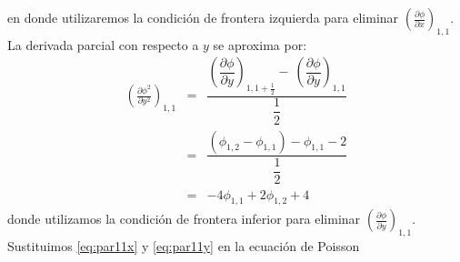 \documentclass[12pt]{article}
\begin{document}
en donde utilizaremos la condición de frontera izquierda para eliminar $\left( \frac{\partial \phi}{\partial x}\right)_{1,1}$. La derivada parcial con respecto a $y$ se aproxima por:
\begin{eqnarray}\label{eq:par11y}
\left( \frac {\partial \phi^{2}}{\partial y^{2}}\right)_{1,1} & = & \dfrac{\left( \dfrac {\partial \phi}{\partial y}\right)_{1,1+\frac{1}{2}} - \ \left( \dfrac {\partial \phi}{\partial y}\right)_{1,1}}{\dfrac{1}{2}}  \nonumber \\
& = & \dfrac {(\phi_{1,2}-\phi_{1,1})-\phi_{1,1}-2}{\dfrac{1}{2}} \nonumber \\
& = & -4\phi_{1,1}+2\phi_{1,2}+4 %
\end{eqnarray}
donde utilizamos la condición de frontera inferior para eliminar $\left( \frac{\partial \phi}{\partial y}\right)_{1,1}$. Sustituimos \ref{eq:par11x} y \ref{eq:par11y} en la ecuación de Poisson
\end{document}
